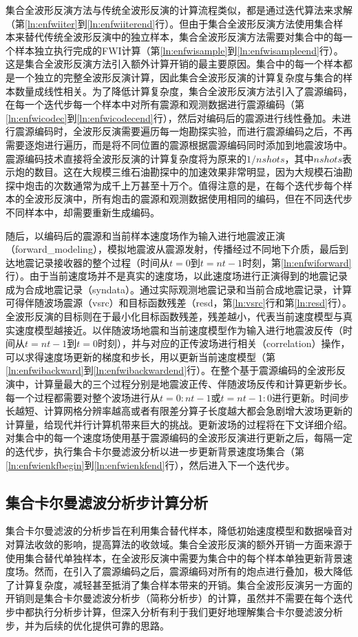 \documentclass[degree=doctor]{thuthesis}
\begin{document}
集合全波形反演方法与传统全波形反演的计算流程类似，都是通过迭代算法来求解（第\ref{ln:enfwiiter}到\ref{ln:enfwiiterend}行）。但由于集合全波形反演方法使用集合样本来替代传统全波形反演中的独立样本，集合全波形反演方法需要对集合中的每一个样本独立执行完成的FWI计算（第\ref{ln:enfwisample}到\ref{ln:enfwisampleend}行）。这是集合全波形反演方法引入额外计算开销的最主要原因。集合中的每一个样本都是一个独立的完整全波形反演计算，因此集合全波形反演的计算复杂度与集合的样本数量成线性相关。为了降低计算复杂度，集合全波形反演方法引入了震源编码，在每一个迭代步每一个样本中对所有震源和观测数据进行震源编码（第\ref{ln:enfwicodec}到\ref{ln:enfwicodecend}行），然后对编码后的震源进行线性叠加。未进行震源编码时，全波形反演需要遍历每一炮勘探实验，而进行震源编码之后，不再需要逐炮进行遍历，而是将不同位置的震源根据震源编码同时添加到地震波场中。震源编码技术直接将全波形反演的计算复杂度将为原来的$1/nshots$，其中$nshots$表示炮的数目。这在大规模三维石油勘探中的加速效果非常明显，因为大规模石油勘探中炮击的次数通常为成千上万甚至十万个。值得注意的是，在每个迭代步每个样本的全波形反演中，所有炮击的震源和观测数据使用相同的编码，但在不同迭代步不同样本中，却需要重新生成编码。

随后，以编码后的震源和当前样本速度场作为输入进行地震波正演（forward\_modeling），模拟地震波从震源发射，传播经过不同地下介质，最后到达地震记录接收器的整个过程（时间从$t=0$到$t=nt-1$时刻，第\ref{ln:enfwiforward}行）。由于当前速度场并不是真实的速度场，以此速度场进行正演得到的地震记录成为合成地震记录（syndata）。通过实际观测地震记录和当前合成地震记录，计算可得伴随波场震源（vsrc）和目标函数残差（resd，第\ref{ln:vsrc}行和第\ref{ln:resd}行）。全波形反演的目标则在于最小化目标函数残差，残差越小，代表当前速度模型与真实速度模型越接近。以伴随波场地震和当前速度模型作为输入进行地震波反传（时间从$t=nt-1$到$t=0$时刻），并与对应的正传波场进行相关（correlation）操作，可以求得速度场更新的梯度和步长，用以更新当前速度模型（第\ref{ln:enfwibackward}到\ref{ln:enfwibackwardend}行）。在整个基于震源编码的全波形反演中，计算量最大的三个过程分别是地震波正传、伴随波场反传和计算更新步长。每一个过程都需要对整个波场进行从$t=0:nt-1$或$t=nt-1:0$进行更新。时间步长越短、计算网格分辨率越高或者有限差分算子长度越大都会急剧增大波场更新的计算量，给现代并行计算机带来巨大的挑战。更新波场的过程将在下文详细介绍。对集合中的每一个速度场使用基于震源编码的全波形反演进行更新之后，每隔一定的迭代步，执行集合卡尔曼滤波分析以进一步更新背景速度场集合（第\ref{ln:enfwienkfbegin}到\ref{ln:enfwienkfend}行），然后进入下一个迭代步。

\subsection{集合卡尔曼滤波分析步计算分析}
集合卡尔曼滤波的分析步旨在利用集合替代样本，降低初始速度模型和数据噪音对对算法收敛的影响，提高算法的收敛域。集合全波形反演的额外开销一方面来源于使用集合替代单独样本，在全波形反演中需要为集合中的每个样本单独更新背景速度场。然而，在引入了震源编码之后，震源编码对所有的炮点进行叠加，极大降低了计算复杂度，减轻甚至抵消了集合样本带来的开销。集合全波形反演另一方面的开销则是集合卡尔曼滤波分析步（简称分析步）的计算，虽然并不需要在每个迭代步中都执行分析步计算，但深入分析有利于我们更好地理解集合卡尔曼滤波分析步，并为后续的优化提供可靠的思路。
\end{document}
